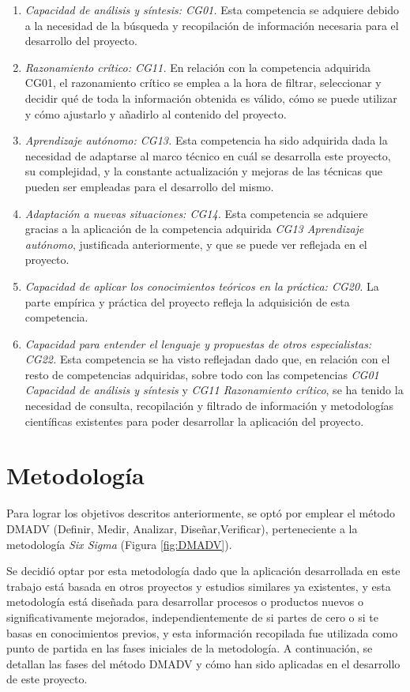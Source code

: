 \begin{enumerate}
  \item \textit{Capacidad de análisis y síntesis: CG01.} Esta competencia se adquiere debido a la necesidad de la búsqueda y recopilación de información necesaria para el desarrollo del proyecto.
  \item \textit{Razonamiento crítico: CG11.} En relación con la competencia adquirida CG01, el razonamiento crítico se emplea a la hora de filtrar, seleccionar y decidir qué de toda la información obtenida es válido, cómo se puede utilizar y cómo ajustarlo y añadirlo al contenido del proyecto.
  \item \textit{Aprendizaje autónomo: CG13.} Esta competencia ha sido adquirida dada  la necesidad de adaptarse al marco técnico en cuál se desarrolla este proyecto, su complejidad, y la constante actualización y mejoras de las técnicas que pueden ser empleadas para el desarrollo del mismo.
  \item \textit{Adaptación a nuevas situaciones: CG14.} Esta competencia se adquiere gracias a la aplicación de la competencia adquirida \textit{CG13 Aprendizaje autónomo}, justificada anteriormente, y que se puede ver reflejada en el proyecto.
  \item \textit{Capacidad de aplicar los conocimientos teóricos en la práctica: CG20.} La parte empírica y práctica del proyecto refleja la adquisición de esta competencia.
  \item \textit{Capacidad para entender el lenguaje y propuestas de otros especialistas: CG22.} Esta competencia se ha visto reflejadan dado que, en relación con el resto de competencias adquiridas, sobre todo con las competencias \textit{CG01 Capacidad de análisis y síntesis} y \textit{CG11 Razonamiento crítico}, se ha tenido la necesidad de consulta, recopilación y filtrado de información y metodologías científicas existentes para poder desarrollar la aplicación del proyecto.
\end{enumerate} 


\section{Metodología}
\label{sec:metodologia}

Para lograr los objetivos descritos anteriormente, se optó por emplear el método DMADV (Definir, Medir, Analizar, Diseñar,Verificar), perteneciente a la metodología \textit{Six Sigma} (Figura \ref{fig:DMADV}). 

Se decidió optar por esta metodología dado que la aplicación desarrollada en este trabajo está basada en otros proyectos y estudios similares ya existentes, y esta metodología está diseñada para desarrollar procesos o productos nuevos o significativamente mejorados, independientemente de si partes de cero o si te basas en conocimientos previos, y esta información recopilada fue utilizada como punto de partida en las fases iniciales de la metodología. A continuación, se detallan las fases del método DMADV y cómo han sido aplicadas en el desarrollo de este proyecto.

